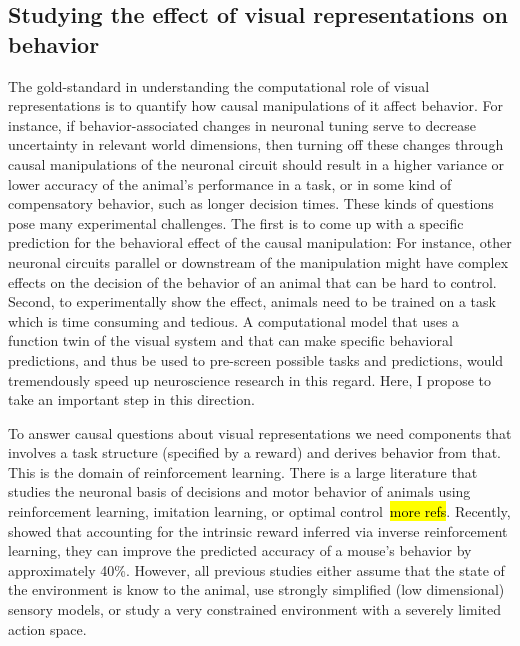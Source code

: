 \documentclass[B2,COG]{ercgrant}
\begin{document}
\subsection{Studying the effect of visual representations on behavior}
The gold-standard in understanding the computational role of visual representations is to quantify how causal manipulations of it affect behavior. 
For instance, if behavior-associated changes in neuronal tuning serve to decrease uncertainty in relevant world dimensions, then turning off these changes through causal manipulations of the neuronal circuit should result in a higher variance or lower accuracy of the animal's performance in a task, or in some kind of compensatory behavior, such as longer decision times.
These kinds of questions pose many experimental challenges. 
The first is to come up with a specific prediction for the behavioral effect of the causal manipulation: For instance, other neuronal circuits parallel or downstream of the manipulation might have complex effects on the decision of the behavior of an animal that can be hard to control. 
Second, to experimentally show the effect, animals need to be trained on a task which is time consuming and tedious. 
A computational model that uses a function twin of the visual system and that can make specific behavioral predictions, and thus be used to pre-screen possible tasks and predictions, would tremendously speed up neuroscience research in this regard. 
Here, I propose to take an important step in this direction. 

To answer causal questions about visual representations we need components that involves a task structure (\eg specified by a reward) and derives behavior from that. 
This is the domain of reinforcement learning.
There is a large literature that studies the neuronal basis of decisions and motor behavior of animals using reinforcement learning, imitation learning, or optimal control~\parencite{Schultz1997-xu}\hl{more refs}.
Recently, \parencite{Kalweit2022-ev} showed that accounting for the intrinsic reward inferred via inverse reinforcement learning, they can improve the predicted accuracy of a mouse's behavior by approximately 40\%.
However, all previous studies either assume that the state of the environment is know to the animal, use strongly simplified (low dimensional) sensory models, or study a very constrained environment with a severely limited action space. 
\end{document}
